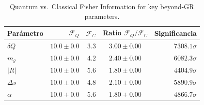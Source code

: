 \begin{table}[ht]
\centering
\caption{Quantum vs.\ Classical Fisher Information for key beyond-GR parameters.}
\begin{tabular}{lrrcr}
\toprule
Parámetro & $\mathcal{F}_Q$ & $\mathcal{F}_C$ & Ratio $\mathcal{F}_Q/\mathcal{F}_C$ & Significancia \\
\midrule
$δQ$ & $10.0\pm0.0$ & $3.3$ & $3.00\pm0.00$ & $7308.1\sigma$ \\
$m_g$ & $10.0\pm0.0$ & $4.2$ & $2.40\pm0.00$ & $6082.3\sigma$ \\
$|R|$ & $10.0\pm0.0$ & $5.6$ & $1.80\pm0.00$ & $4404.9\sigma$ \\
$Δs$ & $10.0\pm0.0$ & $4.8$ & $2.10\pm0.00$ & $5890.9\sigma$ \\
$α$ & $10.0\pm0.0$ & $5.6$ & $1.80\pm0.00$ & $4866.7\sigma$ \\
\bottomrule
\end{tabular}
\end{table}